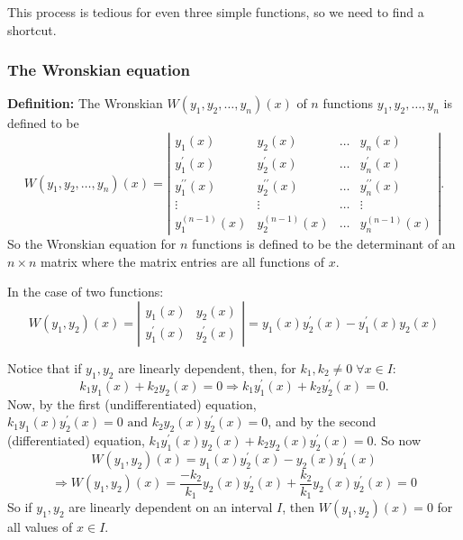 \documentclass[11pt]{article}
\newcommand{\definition}{\textbf{Definition: }}
\newcommand{\yp}{y^{\prime}}
\newcommand{\ypp}{y^{\prime\prime}}
\begin{document}
	This process is tedious for even three simple functions, so we need to find a shortcut.

\subsubsection{The Wronskian equation}
	\definition The Wronskian $W(y_1, y_2, \ldots, y_n)(x)$ of $n$ functions $y_1, y_2, \ldots, y_n$ is defined to be
		$$ W(y_1, y_2, \ldots, y_n)(x) = \left|
			\begin{array}{cccc}
				y_1 (x) & y_2 (x) & \ldots & y_n (x) \\
				\yp_1 (x) & \yp_2 (x) & \ldots & \yp_n (x) \\
				\ypp_1 (x) & \ypp_2 (x) & \ldots & \ypp_n (x) \\
				\vdots & \vdots & \ldots & \vdots \\
				y_1^{(n-1)} (x) & y_2^{(n-1)}(x) & \ldots & y_n^{(n-1)} (x)
			\end{array} \right|. $$
	So the Wronskian equation for $n$ functions is defined to be the determinant of an $n \times n$ matrix where the matrix entries are all functions of $x$.

	In the case of two functions:
		$$ W (y_1, y_2) (x) = \left|
			\begin{array}{cc}
				y_1(x) & y_2 (x) \\
				\yp_1 (x) & \yp_2 (x)
			\end{array} \right| = y_1(x) \yp_2(x) - \yp_1(x) y_2(x) $$

	Notice that if $y_1, y_2$ are linearly dependent, then, for $k_1, k_2 \neq 0 \; \forall x \in I$:
		$$ k_1 y_1(x) + k_2 y_2 (x) = 0 \Rightarrow k_1 \yp_1 (x) + k_2 \yp_2 (x) = 0. $$
	Now, by the first (undifferentiated) equation, $k_1 y_1 (x) \yp_2 (x) = 0 \text{ and } k_2 y_2 (x) \yp_2 (x) = 0$, and by the second (differentiated) equation, $k_1 \yp_1 (x) y_2 (x) + k_2 y_2(x) \yp_2 (x) = 0$. So now
		$$ W(y_1, y_2) (x) = y_1 (x) \yp_2 (x) - y_2 (x) \yp_1 (x) $$
		$$ \Rightarrow W(y_1, y_2) (x) = \frac{-k_2}{k_1} y_2 (x) \yp_2 (x) + \frac{k_2}{k_1} y_2 (x) \yp_2 (x) = 0 $$
	So if $y_1, y_2$ are linearly dependent on an interval $I$, then $W(y_1, y_2) (x) = 0$ for all values of $x \in I$.
\end{document}

